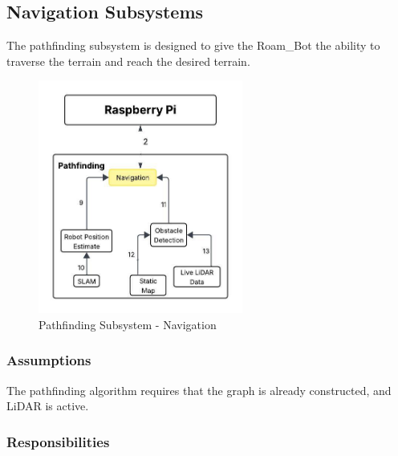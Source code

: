 \subsection{Navigation Subsystems}
The pathfinding subsystem is designed to give the Roam\_Bot the ability to traverse the terrain and reach the desired terrain.
\begin{figure}[h!]
	\centering
 	\includegraphics[width=0.60\textwidth]{images/pathfinding 2/Data_Flow_Navigation.jpeg}
 \caption{Pathfinding Subsystem - Navigation} %
\end{figure}

\subsubsection{Assumptions}

The pathfinding algorithm requires that the graph is already constructed, and LiDAR is active.
\subsubsection{Responsibilities}


